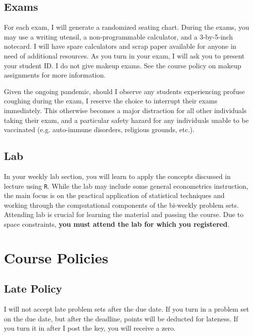 \documentclass[10pt]{article}
\begin{document}
\subsection*{Exams} 

For each exam, I will generate a randomized seating chart. 
During the exams, you may use a writing utensil, a non-programmable calculator, and a 3-by-5-inch notecard. 
I will have spare calculators and scrap paper available for anyone in need of additional resources. 
As you turn in your exam, I will ask you to present your student ID. 
I do not give makeup exams. 
See the course policy on makeup assignments for more information.

\bigskip 

\noindent Given the ongoing pandemic, should I observe any students experiencing profuse coughing during the exam, I reserve the choice to interrupt their exams immediately.
This otherwise becomes a major distraction for all other individuals taking their exam, and a particular safety hazard for any individuals unable to be vaccinated (e.g. auto-immune disorders, religious grounds, etc.).

\subsection*{Lab} 

In your weekly lab section, you will learn to apply the concepts discussed in lecture using \texttt{R}. 
While the lab may include some general econometrics instruction, the main focus is on the practical application of statistical techniques and working through the computational components of the bi-weekly problem sets. 
Attending lab is crucial for learning the material and passing the course. 
Due to space constraints, \textbf{you must attend the lab for which you registered}.

\newpage

\section*{Course Policies}

\subsection*{Late Policy} 

I will not accept late problem sets after the due date. If you turn in a problem set on the due date, but after the deadline, points will be deducted for lateness. If you turn it in after I post the key, you will receive a zero.
\end{document}
